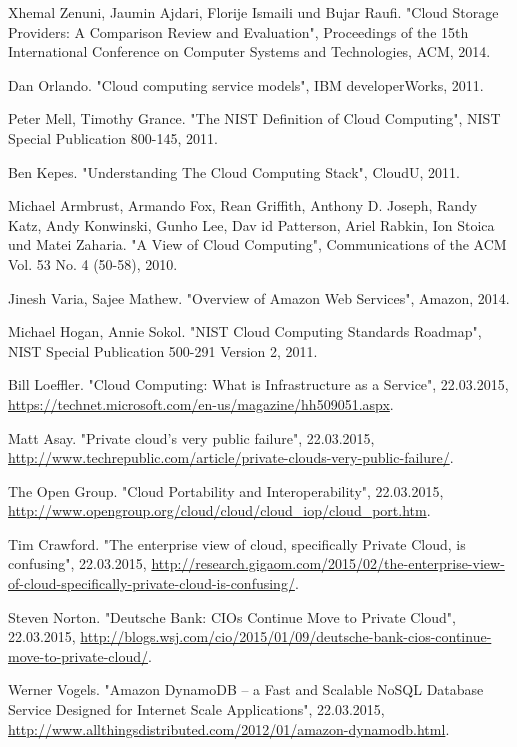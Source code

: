 \begin{thebibliography}{1}
Xhemal Zenuni, Jaumin Ajdari, Florije Ismaili und Bujar Raufi. "Cloud Storage Providers: A Comparison Review and Evaluation", Proceedings of the 15th International Conference on Computer Systems and Technologies, ACM, 2014.

Dan Orlando. "Cloud computing service models", IBM developerWorks, 2011.

Peter Mell, Timothy Grance. "The NIST Definition of Cloud Computing", NIST Special Publication 800-145, 2011.

Ben Kepes. "Understanding The Cloud Computing Stack", CloudU, 2011.

Michael Armbrust, Armando Fox, Rean Griffith, Anthony D. Joseph, Randy Katz, Andy Konwinski, Gunho Lee, Dav id Patterson, Ariel Rabkin, Ion Stoica und Matei Zaharia. "A View of Cloud Computing", Communications of the ACM Vol. 53 No. 4 (50-58), 2010.

Jinesh Varia, Sajee Mathew. "Overview of Amazon Web Services", Amazon, 2014.

Michael Hogan, Annie Sokol. "NIST Cloud Computing Standards Roadmap", NIST Special Publication 500-291 Version 2, 2011.

Bill Loeffler. "Cloud Computing: What is Infrastructure as a Service", 22.03.2015, \url{https://technet.microsoft.com/en-us/magazine/hh509051.aspx}.

Matt Asay. "Private cloud's very public failure", 22.03.2015, \url{http://www.techrepublic.com/article/private-clouds-very-public-failure/}.

The Open Group. "Cloud Portability and Interoperability", 22.03.2015, \url{http://www.opengroup.org/cloud/cloud/cloud_iop/cloud_port.htm}.

Tim Crawford. "The enterprise view of cloud, specifically Private Cloud, is confusing", 22.03.2015, \url{http://research.gigaom.com/2015/02/the-enterprise-view-of-cloud-specifically-private-cloud-is-confusing/}.

Steven Norton. "Deutsche Bank: CIOs Continue Move to Private Cloud", 22.03.2015, \url{http://blogs.wsj.com/cio/2015/01/09/deutsche-bank-cios-continue-move-to-private-cloud/}.

Werner Vogels. "Amazon DynamoDB – a Fast and Scalable NoSQL Database Service Designed for Internet Scale Applications", 22.03.2015, \url{http://www.allthingsdistributed.com/2012/01/amazon-dynamodb.html}.


\end{thebibliography}
